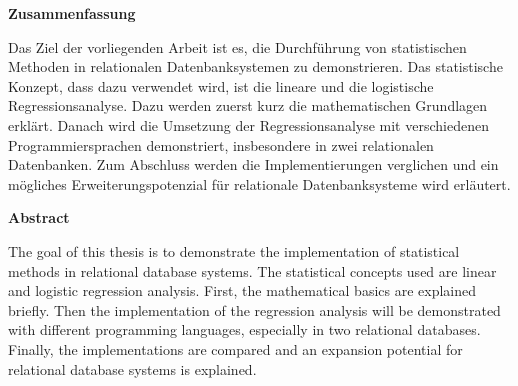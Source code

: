 

\clearemptydoublepage
{}
{}





\vspace*{2cm}
\begin{center}
{\Large \bf Zusammenfassung}
\end{center}
\vspace{1cm}

Das Ziel der vorliegenden Arbeit ist es, die Durchführung von statistischen Methoden in relationalen Datenbanksystemen zu demonstrieren. Das statistische Konzept, dass dazu verwendet wird, ist die lineare und die logistische Regressionsanalyse. Dazu werden zuerst kurz die mathematischen Grundlagen erklärt. Danach wird die Umsetzung der Regressionsanalyse mit verschiedenen Programmiersprachen demonstriert, insbesondere in zwei relationalen Datenbanken. Zum Abschluss werden die Implementierungen verglichen und ein mögliches Erweiterungspotenzial für relationale Datenbanksysteme wird erläutert.

\vspace*{3cm}
\begin{center}
{\Large \bf Abstract}
\end{center}
\vspace{1cm}

The goal of this thesis is to demonstrate the implementation of statistical methods in relational database systems. The statistical concepts used are linear and logistic regression analysis. First, the mathematical basics are explained briefly. Then the implementation of the regression analysis will be demonstrated with different programming languages, especially in two relational databases. Finally, the implementations are compared and an expansion potential for relational database systems is explained.
